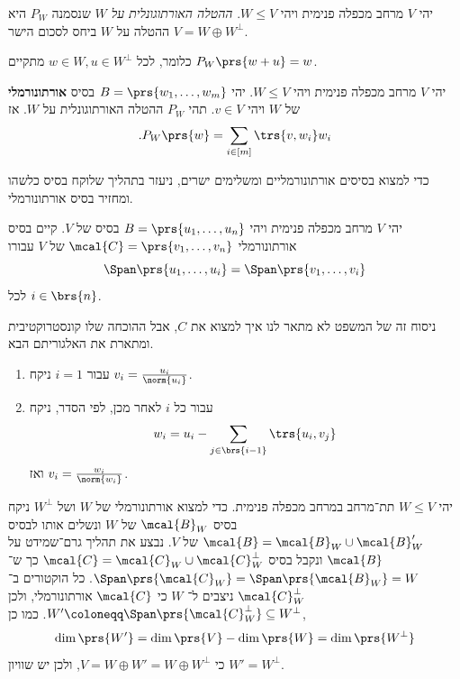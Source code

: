 \documentclass[a4paper,10pt,twoside,openany]{book}
\begin{document}
\begin{definition}
יהי
$V$
מרחב מכפלה פנימית ויהי
$W \leq V$.
\emph{ההטלה האורתוגונלית על
$W$}
שנסמנה
$P_W$
היא ההטלה על
$W$
ביחס לסכום הישר
$V = W \oplus W^\perp$.

כלומר, לכל
$w \in W, u \in W^\perp$
מתקיים
$P_W\prs{w + u} = w$.
\end{definition}

\begin{proposition}
יהי
$V$
מרחב מכפלה פנימית ויהי
$W \leq V$.
יהי
$B = \prs{w_1, \ldots, w_m}$
בסיס
\textbf{אורתונורמלי}
של
$W$
ויהי
$v \in V$.
תהי
$P_W$
ההטלה האורתוגונלית על
$W$.
אז
\[\text{.} P_W\prs{w} = \sum_{i \in [m]} \trs{v, w_i} w_i\]
\end{proposition}

כדי למצוא בסיסים אורתונורמליים ומשלימים ישרים, ניעזר בתהליך שלוקח בסיס כלשהו ומחזיר בסיס אורתונורמלי.

\begin{theorem}
יהי
$V$
מרחב מכפלה פנימית ויהי
$B = \prs{u_1, \ldots, u_n}$
בסיס של
$V$.
קיים בסיס אורתונורמלי
$\mcal{C} = \prs{v_1, \ldots, v_n}$
של
$V$
עבורו
\[\Span\prs{u_1, \ldots, u_i} = \Span\prs{v_1, \ldots, v_i}\]
לכל
$i \in \brs{n}$.
\end{theorem}

ניסוח זה של המשפט לא מתאר לנו איך למצוא את
$C$,
אבל ההוכחה שלו קונסטרוקטיבית ומתארת את האלגוריתם הבא.

\begin{enumerate}
\item
עבור
$i = 1$
ניקח
$v_i = \frac{u_i}{\norm{u_i}}$.

\item
עבור כל
$i$
לאחר מכן, לפי הסדר, ניקח
\[w_i = u_i - \sum_{j \in \brs{i-1}} \trs{u_i, v_j}\]
ואז
$v_i = \frac{w_i}{\norm{w_i}}$.
\end{enumerate}

\begin{corollary}
יהי
$W \leq V$
תת־מרחב במרחב מכפלה פנימית.
כדי למצוא אורתונורמלי של
$W$
ושל
$W^\perp$
ניקח בסיס
$\mcal{B}_W$
של
$W$
ונשלים אותו לבסיס
$\mcal{B} = \mcal{B}_W \cup \mcal{B}'_W$
של
$V$.
נבצע את תהליך גרם־שמידט על
$\mcal{B}$
ונקבל בסיס
$\mcal{C} = \mcal{C}_W \cup \mcal{C}_W^\perp$
כך ש־%
$\Span\prs{\mcal{C}_W} = \Span\prs{\mcal{B}_W} = W$.
כל הוקטורים ב־%
$\mcal{C}_W^\perp$
ניצבים ל־%
$W$
כי
$\mcal{C}$
אורתונורמלי, ולכן
$W' \coloneqq \Span\prs{\mcal{C}_W^\perp} \subseteq W^\perp$.
כמו כן,
\[\dim\prs{W'} = \dim\prs{V} - \dim\prs{W} = \dim\prs{W^\perp}\]
כי
$V = W \oplus W' = W \oplus W^\perp$,
ולכן יש שוויון
$W' = W^\perp$.
\end{corollary}
\end{document}

